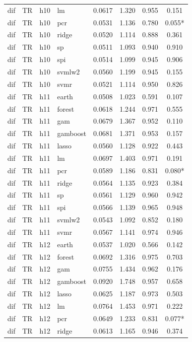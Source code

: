 \begin{ThreePartTable}
\begin{longtable}[t]{llclcccc}
dif & TR & h10 & lm & 0.0617 & 1.320 & 0.955 & 0.151\\
dif & TR & h10 & pcr & 0.0531 & 1.136 & 0.780 & 0.055*\\
dif & TR & h10 & ridge & 0.0520 & 1.114 & 0.888 & 0.361\\
dif & TR & h10 & sp & 0.0511 & 1.093 & 0.940 & 0.910\\
dif & TR & h10 & spi & 0.0514 & 1.099 & 0.945 & 0.906\\
dif & TR & h10 & svmlw2 & 0.0560 & 1.199 & 0.945 & 0.155\\
dif & TR & h10 & svmr & 0.0521 & 1.114 & 0.950 & 0.826\\
\addlinespace
dif & TR & h11 & earth & 0.0508 & 1.023 & 0.591 & 0.107\\
dif & TR & h11 & forest & 0.0618 & 1.244 & 0.971 & 0.555\\
dif & TR & h11 & gam & 0.0679 & 1.367 & 0.952 & 0.110\\
dif & TR & h11 & gamboost & 0.0681 & 1.371 & 0.953 & 0.157\\
dif & TR & h11 & lasso & 0.0560 & 1.128 & 0.922 & 0.443\\
dif & TR & h11 & lm & 0.0697 & 1.403 & 0.971 & 0.191\\
dif & TR & h11 & pcr & 0.0589 & 1.186 & 0.831 & 0.080*\\
dif & TR & h11 & ridge & 0.0564 & 1.135 & 0.923 & 0.384\\
dif & TR & h11 & sp & 0.0561 & 1.129 & 0.960 & 0.942\\
dif & TR & h11 & spi & 0.0566 & 1.139 & 0.965 & 0.948\\
dif & TR & h11 & svmlw2 & 0.0543 & 1.092 & 0.852 & 0.180\\
dif & TR & h11 & svmr & 0.0567 & 1.141 & 0.974 & 0.946\\
\addlinespace
dif & TR & h12 & earth & 0.0537 & 1.020 & 0.566 & 0.142\\
dif & TR & h12 & forest & 0.0692 & 1.316 & 0.975 & 0.703\\
dif & TR & h12 & gam & 0.0755 & 1.434 & 0.962 & 0.176\\
dif & TR & h12 & gamboost & 0.0920 & 1.748 & 0.957 & 0.658\\
dif & TR & h12 & lasso & 0.0625 & 1.187 & 0.973 & 0.503\\
dif & TR & h12 & lm & 0.0764 & 1.453 & 0.971 & 0.222\\
dif & TR & h12 & pcr & 0.0649 & 1.233 & 0.831 & 0.077*\\
dif & TR & h12 & ridge & 0.0613 & 1.165 & 0.946 & 0.374\\

\end{longtable}
\end{ThreePartTable}
